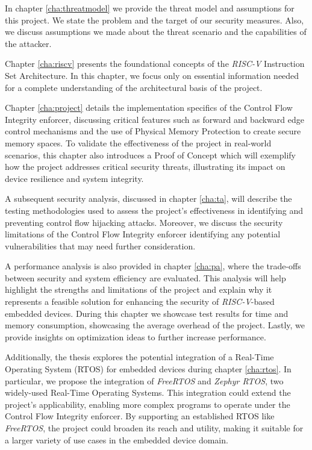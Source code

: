 In chapter \ref{cha:threatmodel} we provide the threat model and assumptions for
this project. We state the problem and the target of our security measures. Also,
we discuss assumptions we made about the threat scenario and the capabilities of
the attacker.

Chapter \ref{cha:riscv} presents the foundational concepts of the \textit{RISC-V}
Instruction Set Architecture. In this chapter, we focus only on essential information
needed for a complete understanding of the architectural basis of the project.

Chapter \ref{cha:project} details the implementation specifics of the Control Flow
Integrity enforcer, discussing critical features such as forward and backward
edge control mechanisms and the use of Physical Memory Protection to create
secure memory spaces. To validate the effectiveness of the project in real-world
scenarios, this chapter also introduces a Proof of Concept which will exemplify
how the project addresses critical security threats, illustrating its impact on device
resilience and system integrity.

A subsequent security analysis, discussed in chapter \ref{cha:ta}, will describe
the testing methodologies used to assess the project's effectiveness in identifying
and preventing control flow hijacking attacks. Moreover, we discuss the security
limitations of the Control Flow Integrity enforcer identifying any potential vulnerabilities
that may need further consideration.

A performance analysis is also provided in chapter \ref{cha:pa}, where the trade-offs
between security and system efficiency are evaluated. This analysis will help highlight
the strengths and limitations of the project and explain why it represents a feasible
solution for enhancing the security of \textit{RISC-V}-based embedded devices. During
this chapter we showcase test results for time and memory consumption,
showcasing the average overhead of the project. Lastly, we provide insights on
optimization ideas to further increase performance.

Additionally, the thesis explores the potential integration of a Real-Time Operating
System (RTOS) for embedded devices during chapter \ref{cha:rtos}. In particular,
we propose the integration of \textit{FreeRTOS} and \textit{Zephyr RTOS}, two
widely-used Real-Time Operating Systems. This integration could extend the project's
applicability, enabling more complex programs to operate under the Control Flow
Integrity enforcer. By supporting an established RTOS like \textit{FreeRTOS}, the
project could broaden its reach and utility, making it suitable for a larger
variety of use cases in the embedded device domain.

